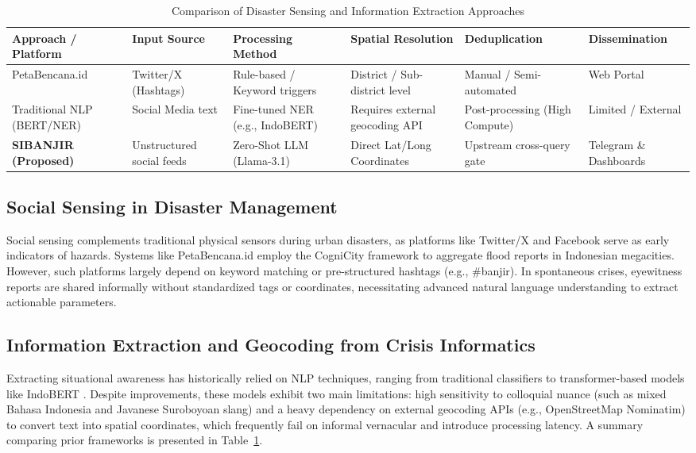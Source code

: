 \documentclass[conference]{IEEEtran}
\begin{document}
\begin{table}[htbp]
\caption{Comparison of Disaster Sensing and Information Extraction Approaches}
\label{tab:comparison}
\centering
\small
\begin{tabularx}{\textwidth}{@{} >{\raggedright\arraybackslash}p{3cm} >{\raggedright\arraybackslash}p{2.5cm} >{\raggedright\arraybackslash}X >{\raggedright\arraybackslash}X >{\raggedright\arraybackslash}X >{\raggedright\arraybackslash}X @{}}
\toprule
\textbf{Approach / Platform} & \textbf{Input Source} & \textbf{Processing Method} & \textbf{Spatial Resolution} & \textbf{Deduplication} & \textbf{Dissemination} \\ \midrule
PetaBencana.id \cite{holderness2015petajakarta} & Twitter/X (Hashtags) & Rule-based / Keyword triggers & District / Sub-district level & Manual / Semi-automated & Web Portal \\
Traditional NLP (BERT/NER) & Social Media text & Fine-tuned NER (e.g., IndoBERT) & Requires external geocoding API & Post-processing (High Compute) & Limited / External \\
\textbf{SIBANJIR (Proposed)} & Unstructured social feeds & Zero-Shot LLM (Llama-3.1) & Direct Lat/Long Coordinates & Upstream cross-query gate & Telegram \& Dashboards \\ \bottomrule
\end{tabularx}
\end{table}

\subsection{Social Sensing in Disaster Management}
Social sensing complements traditional physical sensors during urban disasters, as platforms like Twitter/X and Facebook serve as early indicators of hazards. Systems like PetaBencana.id employ the CogniCity framework \cite{holderness2015petajakarta} to aggregate flood reports in Indonesian megacities. However, such platforms largely depend on keyword matching or pre-structured hashtags (e.g., \#banjir). In spontaneous crises, eyewitness reports are shared informally without standardized tags or coordinates, necessitating advanced natural language understanding to extract actionable parameters.

\subsection{Information Extraction and Geocoding from Crisis Informatics}
Extracting situational awareness has historically relied on NLP techniques, ranging from traditional classifiers to transformer-based models like IndoBERT \cite{koto2020indobert}. Despite improvements, these models exhibit two main limitations: high sensitivity to colloquial nuance (such as mixed Bahasa Indonesia and Javanese Suroboyoan slang) and a heavy dependency on external geocoding APIs (e.g., OpenStreetMap Nominatim) to convert text into spatial coordinates, which frequently fail on informal vernacular and introduce processing latency. A summary comparing prior frameworks is presented in Table~\ref{tab:comparison}.
\end{document}
